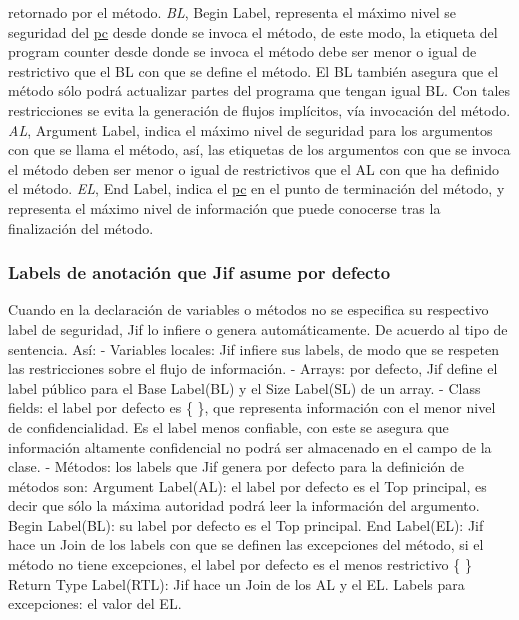 retornado por el método.\newline 
\emph{BL}, Begin Label, representa el máximo nivel se seguridad del
\underline{pc} desde donde se invoca el método, de este modo,
la etiqueta del program counter desde donde se invoca el método debe ser
menor o igual de restrictivo que el BL con que se define el método. El BL
también asegura que el método sólo podrá actualizar partes del programa que
tengan igual BL. Con tales restricciones se evita la generación de flujos
implícitos, vía invocación del método.\newline
\emph{AL}, Argument Label, indica el máximo nivel de seguridad para los
argumentos con que se llama el método, así, las etiquetas de los argumentos con
que se invoca el método deben ser menor o igual de restrictivos que el AL con que ha
definido el método.\newline 
\emph{EL}, End Label, indica el \underline{pc} en el punto de terminación del
método, y representa el máximo nivel de información que puede conocerse tras la
finalización del método.

\subsubsection{Labels de anotación que Jif asume por defecto}
\label{sssec:default-labels}
Cuando en la declaración de variables o métodos no se especifica su respectivo
label de seguridad, Jif lo infiere o genera automáticamente. De acuerdo al tipo
de sentencia. Así:\newline
- Variables locales: Jif infiere sus labels, de modo que se respeten las
restricciones sobre el flujo de información.\newline
- Arrays: por defecto, Jif define el label público para el Base Label(BL) y el
Size Label(SL) de un array.\newline
- Class fields: el label por defecto es \{ \}, que representa información con el
menor nivel de confidencialidad. Es el label menos confiable, con este se
asegura que información altamente confidencial no podrá ser almacenado en el
campo de la clase.\newline
- Métodos: los labels que Jif genera por defecto para la definición de
métodos son:\newline 
Argument Label(AL): el label por defecto es el Top principal, es decir que sólo
la máxima autoridad podrá leer la información del argumento.\newline 
Begin Label(BL): su label por defecto es el Top principal.\newline
End Label(EL): Jif hace un Join de los labels con que se definen las
excepciones del método, si el método no tiene excepciones, el label por defecto
es el menos restrictivo \{ \}\newline
Return Type Label(RTL): Jif hace un Join de los AL y el EL.\newline
Labels para excepciones: el valor del EL.\newline
